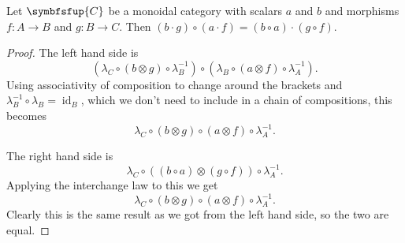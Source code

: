 \documentclass[fleqn]{NotesClass}
\newcommand{\cat}[1]{\symbfsfup{#1}}
\DeclareMathOperator{\id}{id}
\begin{document}
    \begin{lma}{}{}
        Let \(\cat{C}\) be a monoidal category with scalars \(a\) and \(b\) and morphisms \(f\colon A \to B\) and \(g \colon B \to C\).
        Then \((b \cdot g) \circ (a \cdot f) = (b \circ a) \cdot (g \circ f)\).
        \begin{proof}
            The left hand side is
            \begin{equation}
                (\lambda_C \circ (b \otimes g) \circ \lambda_B^{-1}) \circ (\lambda_B \circ (a \otimes f) \circ \lambda_A^{-1}).
            \end{equation}
            Using associativity of composition to change around the brackets and \(\lambda_B^{-1} \circ \lambda_B = \id_B\), which we don't need to include in a chain of compositions, this becomes
            \begin{equation}
                \lambda_C \circ (b \otimes g) \circ (a \otimes f) \circ \lambda_A^{-1}.
            \end{equation}
            
            The right hand side is
            \begin{equation}
                \lambda_C \circ ((b \circ a) \otimes (g \circ f)) \circ \lambda_{A}^{-1}.
            \end{equation}
            Applying the interchange law to this we get
            \begin{equation}
                \lambda_C \circ (b \otimes g) \circ (a \otimes f) \circ \lambda_{A}^{-1}.
            \end{equation}
            Clearly this is the same result as we got from the left hand side, so the two are equal.
        \end{proof}
    \end{lma}
    
\end{document}
